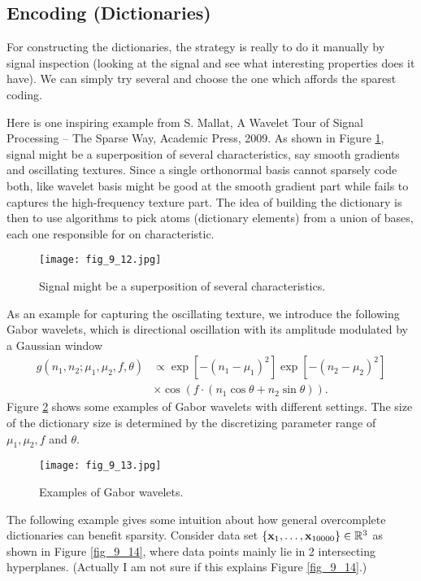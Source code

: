 \documentclass[../main.tex]{subfiles}
\begin{document}
\subsection{Encoding (Dictionaries)}
For constructing the dictionaries, the strategy is really to do it manually by signal inspection (looking at the signal and see what interesting properties does it have). We can simply try several and choose the one which affords the sparest coding. 
\par Here is one inspiring example from S. Mallat, A Wavelet Tour of Signal Processing – The Sparse Way, Academic Press, 2009. As shown in Figure \ref{fig_9_12}, signal might be a superposition of several characteristics, say smooth gradients and oscillating textures. Since a single orthonormal basis cannot sparsely code both, like wavelet basis might be good at the smooth gradient part while fails to captures the high-frequency texture part. The idea of building the dictionary is then to use algorithms to pick atoms (dictionary elements) from a union of bases, each one responsible for on characteristic.
\begin{figure}[h] 
	\centering 
	\texttt{[image: fig\_9\_12.jpg]} 
	\caption{Signal might be a superposition of several characteristics.}\label{fig_9_12}
\end{figure}
\par As an example for capturing the oscillating texture, we introduce the following Gabor wavelets, which is directional oscillation with its amplitude modulated by a Gaussian window
\begin{align*}
g(n_1,n_2;\mu_1,\mu_2,f,\theta)&\propto \exp[-(n_1-\mu_1)^2]\exp[-(n_2-\mu_2)^2]\\
&\times\cos(f\cdot(n_1\cos \theta+n_2\sin\theta)).
\end{align*}
Figure \ref{fig_9_13} shows some examples of Gabor wavelets with different settings. The size of the dictionary size is determined by the discretizing parameter range of $\mu_1,\mu_2,f$ and $\theta$.
\begin{figure}[h] 
	\centering 
	\texttt{[image: fig\_9\_13.jpg]} 
	\caption{Examples of Gabor wavelets.}\label{fig_9_13}
\end{figure}
\par The following example gives some intuition about how general overcomplete dictionaries can benefit sparsity. Consider data set $\{{\bf x}_1,\dots,{\bf x}_{10000}\}\in \mathbb{R}^3$ as shown in Figure \ref{fig_9_14}, where data points mainly lie in 2 intersecting hyperplanes. (Actually I am not sure if this explains Figure \ref{fig_9_14}.)
\end{document}
